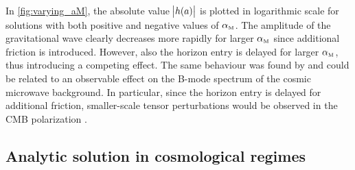 In \autoref{fig:varying_aM}, the absolute value \(\abs{h(a)}\) is plotted in logarithmic scale for solutions with both positive and negative values of \({\alpha_{\textnormal{\tiny{M}}}}\). The amplitude of the gravitational wave clearly decreases more rapidly for larger \({\alpha_{\textnormal{\tiny{M}}}}\) since additional friction is introduced. However, also the horizon entry is delayed for larger \({\alpha_{\textnormal{\tiny{M}}}}\), thus introducing a competing effect. The same behaviour was found by \textcite{Pettorino2014} and could be related to an observable effect on the B-mode spectrum of the cosmic microwave background. In particular, since the horizon entry is delayed for additional friction, smaller-scale tensor perturbations would be observed in the CMB polarization \autocite{Pettorino2014}.


\subsection{Analytic solution in cosmological regimes}

